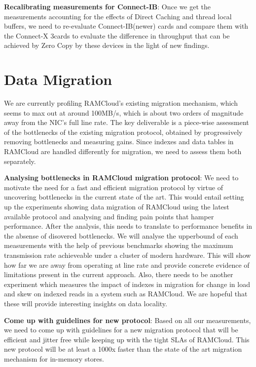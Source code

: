 \textbf{Recalibrating measurements for Connect-IB\textregistered}: Once we get the 
measurements accounting for the effects of Direct Caching and thread local buffers,
we need to re-evaluate Connect-IB\textregistered (newer) cards and compare them 
with the Connect-X 3\textregistered cards to evaluate the difference in 
throughput that can be achieved by Zero Copy by these devices in the light of new findings.



\section{Data Migration}
We are currently profiling RAMCloud’s existing migration mechanism, which seems to max out
at around 100MB/s, which is about two orders of magnitude away from the NIC's full line rate.
The key deliverable is a piece-wise assessment of the bottlenecks of the existing migration
protocol, obtained by progressively removing bottlenecks and measuring gains. Since 
indexes and data tables in RAMCloud are handled differently for migration, we need
to assess them both separately.


\textbf{Analysing bottlenecks in RAMCloud migration protocol}: We need to motivate the need for a fast and efficient migration protocol 
by virtue of uncovering bottlenecks in the current state of the art. This would entail
setting up the experiments showing data migration of RAMCloud using the latest 
available protocol and analysing and finding pain points that hamper performance.
After the analysis, this needs to translate to performance benefits in the absense
of disovered bottlenecks.  We will analyse the upperbound of each measurements with the help
of previous benchmarks showing the maximum transmission rate achieveable under 
a cluster of modern hardware. This will show how far we are away from 
operating at line rate and provide concrete evidence of limitations present in 
the current approach. Also, there needs to be another experiment which measures
the impact of indexes in migration for change in load and skew on indexed reads
in a system such as RAMCloud. We are hopeful that these will provide interesting
insights on data locality.

\textbf{Come up with guidelines for new protocol}: Based on all our measurements,
we need to come up with guidelines for a new migration protocol that will be efficient
and jitter free while keeping up with the tight SLAs of RAMCloud. This new protocol 
will be at least a 1000x faster than the state of the art migration mechanism 
for in-memory stores.



%